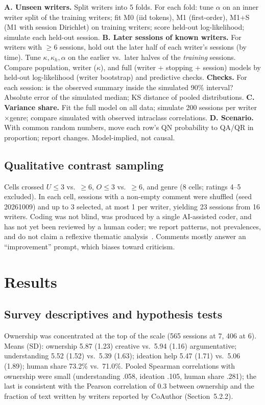 \documentclass[10pt]{article}
\begin{document}
\begin{algorithm}[h]
\small
\caption{Validation and use of the microsimulation (seed 20261009; 100 replicates per session)}
\begin{algorithmic}[1]
\State \textbf{A. Unseen writers.} Split writers into 5 folds. For each fold: tune $\alpha$ on an inner writer split of the training writers; fit M0 (iid tokens), M1 (first-order), M1+S (M1 with session Dirichlet) on training writers; score held-out log-likelihood; simulate each held-out session.
\State \textbf{B. Later sessions of known writers.} For writers with $\ge$6 sessions, hold out the later half of each writer's sessions (by time). Tune $\kappa,\kappa_h,\alpha$ on the earlier vs.\ later halves of the \emph{training} sessions. Compare population, writer ($\kappa$), and full (writer + stopping + session) models by held-out log-likelihood (writer bootstrap) and predictive checks.
\State \textbf{Checks.} For each session: is the observed summary inside the simulated 90\% interval? Absolute error of the simulated median; KS distance of pooled distributions.
\State \textbf{C. Variance share.} Fit the full model on all data; simulate 200 sessions per writer$\times$genre; compare simulated with observed intraclass correlations.
\State \textbf{D. Scenario.} With common random numbers, move each row's QN probability to QA/QR in proportion; report changes. Model-implied, not causal.
\end{algorithmic}
\end{algorithm}

\subsection{Qualitative contrast sampling}
Cells crossed $U\le3$ vs.\ $\ge6$, $O\le3$ vs.\ $\ge6$, and genre (8 cells; ratings 4--5 excluded). In each cell, sessions with a non-empty comment were shuffled (seed 20261009) and up to 3 selected, at most 1 per writer, yielding 23 sessions from 16 writers.
Coding was not blind, was produced by a single AI-assisted coder, and has not yet been reviewed by a human coder; we report patterns, not prevalences, and do not claim a reflexive thematic analysis~\cite{braun2021}. Comments mostly answer an ``improvement'' prompt, which biases toward criticism.

\section{Results}
\subsection{Survey descriptives and hypothesis tests}
Ownership was concentrated at the top of the scale (565 sessions at 7, 406 at 6). Means (SD): ownership 5.87 (1.23) creative vs.\ 5.94 (1.16) argumentative; understanding 5.52 (1.52) vs.\ 5.39 (1.63); ideation help 5.47 (1.71) vs.\ 5.06 (1.89); human share 73.2\% vs.\ 71.0\%. Pooled Spearman correlations with ownership were small (understanding .058, ideation .105, human share .281); the last is consistent with the Pearson correlation of 0.3 between ownership and the fraction of text written by writers reported by CoAuthor (Section~5.2.2).
\end{document}
